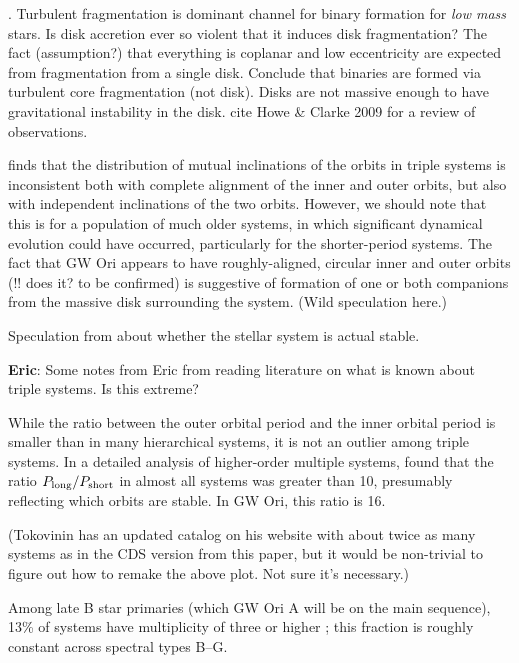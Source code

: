 \documentclass[twocolumn]{aastex61}
\begin{document}
\citep{offner10}.
Turbulent fragmentation is dominant channel for binary formation for \emph{low mass} stars. Is disk accretion ever so violent that it induces disk fragmentation? The fact (assumption?) that everything is coplanar and low eccentricity are expected from fragmentation from a single disk. Conclude that binaries are formed via turbulent core fragmentation (not disk). Disks are not massive enough to have gravitational instability in the disk. \citet{offner10} cite Howe \& Clarke 2009 for a review of observations.

\citet{tokovinin97} finds that the distribution of mutual inclinations of the orbits in triple systems is inconsistent both with complete alignment of the inner and outer orbits, but also with independent inclinations of the two orbits.  However, we should note that this is for a population of much older systems, in which significant dynamical evolution could have occurred, particularly for the shorter-period systems.  The fact that GW Ori appears to have roughly-aligned, circular inner and outer orbits (!! does it?  to be confirmed) is suggestive of formation of one or both companions from the massive disk surrounding the system.  (Wild speculation here.)

Speculation from \citet{berger11} about whether the stellar system is actual stable.





\textbf{Eric}: Some notes from Eric from reading literature on what is known about triple systems.  Is this extreme?

While the ratio between the outer orbital period and the inner orbital period is smaller than in many hierarchical systems, it is not an outlier among triple systems.  In a detailed analysis of higher-order multiple systems, \citet{tokovinin97} found that the ratio $P_\mathrm{long} / P_{\rm short}$ in almost all systems was greater than 10, presumably reflecting which orbits are stable.  In GW Ori, this ratio is 16.

(Tokovinin has an updated catalog on his website with about twice as many systems as in the CDS version from this paper, but it would be non-trivial to figure out how to remake the above plot.  Not sure it's necessary.)

Among late B star primaries (which GW Ori A will be on the main sequence), 13\% of systems have multiplicity of three or higher \citep{eggleton08}; this fraction is roughly constant across spectral types B--G.
\end{document}
